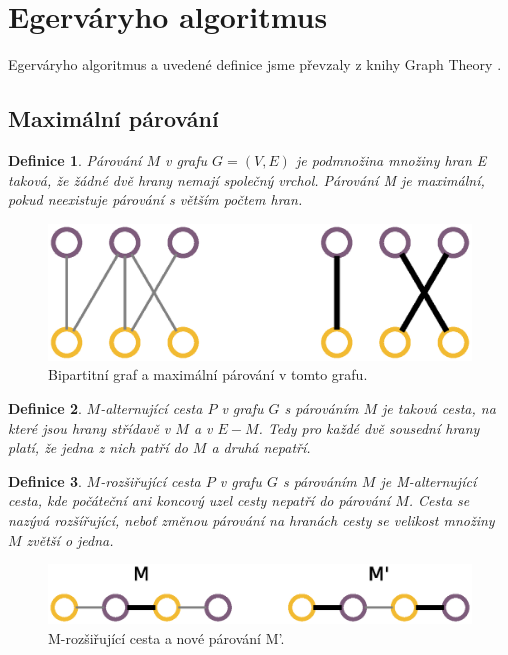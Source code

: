 \documentclass[a4paper, 11pt, titlepage, final]{article}[3. prosinec 2011]
\newtheorem{Definice}{Definice}
\begin{document}
\section{Egerváryho algoritmus} \label{secEgervary}

Egerváryho algoritmus a uvedené definice jsme převzaly z knihy Graph Theory \cite{bondy:2008}.

\subsection{Maximální párování}

\begin{Definice}
\textit{Párování} $M$ v grafu $G=(V,E)$ je podmnožina množiny hran E taková, že žádné dvě hrany nemají společný vrchol. Párování M je maximální, pokud neexistuje párování s větším počtem hran.
\end{Definice}

\begin{figure}[ht]
  \centering
  \includegraphics[scale=0.5]{img/bipartite.eps}
  \caption{Bipartitní graf a maximální párování v tomto grafu.}
  \label{imgBipartite}
\end{figure}


\begin{Definice}
\textit{$M$-alternující cesta} $P$ v grafu $G$ s párováním $M$ je taková cesta, na které jsou hrany střídavě v $M$ a v $E-M$. Tedy pro každé dvě sousední hrany platí, že jedna z nich patří do $M$ a druhá nepatří.
\end{Definice}

\begin{Definice}
\textit{$M$-rozšiřující cesta} $P$ v grafu $G$ s párováním $M$ je M-alternující cesta, kde počáteční ani koncový uzel cesty nepatří do párování $M$. Cesta se nazývá rozšířující, neboť změnou párování na hranách cesty se velikost množiny $M$ zvětší o jedna.
\end{Definice}

\begin{figure}[ht]
  \centering
  \includegraphics[scale=0.5]{img/mpath.eps}
  \caption{M-rozšiřující cesta a nové párování M'.}
  \label{imgPath}
\end{figure}
\end{document}
